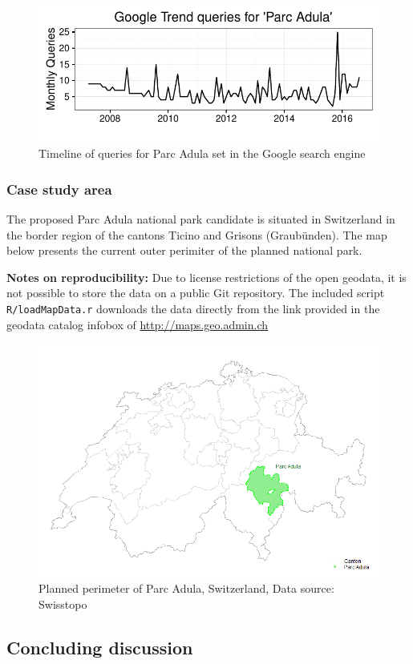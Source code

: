 \documentclass[]{article}
\begin{document}
\begin{figure}[htbp]
\centering
\includegraphics{publication_files/figure-latex/googleTrend-1.pdf}
\caption{Timeline of queries for Parc Adula set in the Google search
engine}
\end{figure}

\subsubsection{Case study area}\label{case-study-area}

The proposed Parc Adula national park candidate is situated in
Switzerland in the border region of the cantons Ticino and Grisons
(Graubünden). The map below presents the current outer perimiter of the
planned national park.

\textbf{Notes on reproducibility:} Due to license restrictions of the
open geodata, it is not possible to store the data on a public Git
repository. The included script \texttt{R/loadMapData.r} downloads the
data directly from the link provided in the geodata catalog infobox of
\url{http://maps.geo.admin.ch}

\begin{figure}
\includegraphics[width=0.6\linewidth]{figures/map} \caption{Planned perimeter of Parc Adula, Switzerland, Data source: Swisstopo}\label{fig:map}
\end{figure}

\subsection{Concluding discussion}\label{concluding-discussion}
\end{document}
